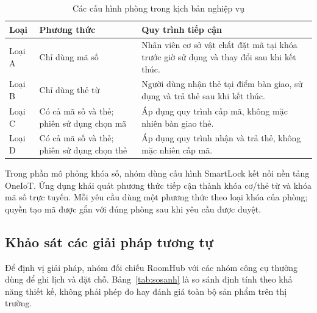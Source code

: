 \documentclass[../DoAn.tex]{subfiles}
\begin{document}
\begin{table}[H]
\centering\small
\renewcommand{\arraystretch}{1.2}
\caption{Các cấu hình phòng trong kịch bản nghiệp vụ}
\label{tab:loaiphong}
\begin{tabularx}{\textwidth}{|p{1.6cm}|p{4.2cm}|X|}
\hline
\textbf{Loại} & \textbf{Phương thức} & \textbf{Quy trình tiếp cận} \\ \hline
Loại A & Chỉ dùng mã số & Nhân viên cơ sở vật chất đặt mã tại khóa trước giờ sử dụng và thay đổi sau khi kết thúc. \\ \hline
Loại B & Chỉ dùng thẻ từ & Người dùng nhận thẻ tại điểm bàn giao, sử dụng và trả thẻ sau khi kết thúc. \\ \hline
Loại C & Có cả mã số và thẻ; phiên sử dụng chọn mã & Áp dụng quy trình cấp mã, không mặc nhiên bàn giao thẻ. \\ \hline
Loại D & Có cả mã số và thẻ; phiên sử dụng chọn thẻ & Áp dụng quy trình nhận và trả thẻ, không mặc nhiên cấp mã. \\ \hline
\end{tabularx}
\end{table}

Trong phần mô phỏng khóa số, nhóm dùng cấu hình SmartLock kết nối nền tảng OneIoT. Ứng dụng khái quát phương thức tiếp cận thành khóa cơ/thẻ từ và khóa mã số trực tuyến. Mỗi yêu cầu dùng một phương thức theo loại khóa của phòng; quyền tạo mã được gắn với đúng phòng sau khi yêu cầu được duyệt.

\subsection{Khảo sát các giải pháp tương tự}
Để định vị giải pháp, nhóm đối chiếu RoomHub với các nhóm công cụ thường dùng để ghi lịch và đặt chỗ. Bảng~\ref{tab:sosanh} là so sánh định tính theo khả năng thiết kế, không phải phép đo hay đánh giá toàn bộ sản phẩm trên thị trường.
\end{document}
